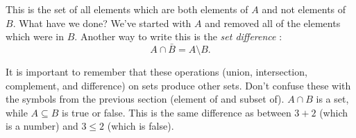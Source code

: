 \documentclass[10pt,]{book}
\theoremstyle{plain}
\theoremstyle{definition}
\theoremstyle{definition}
\theoremstyle{definition}
\numberwithin{equation}{section}
\begin{document}
      This is the set of all elements which are both elements of \(A\) and not elements of \(B\). What have we done? We've started with \(A\) and removed all of the elements which were in \(B\). Another way to write this is the \emph{set difference}
      :
      \begin{equation*}
        A \cap \bar B = A \setminus B.
      \end{equation*}
\par

      It is important to remember that these operations (union, intersection, complement, and difference) on sets produce other sets. Don't confuse these with the symbols from the previous section (element of and subset of). \(A \cap B\) is a set,
      while \(A \subseteq B\) is true or false. This is the same difference as between \(3 + 2\) (which is a number) and \(3 \le 2\) (which is false).
\end{document}
